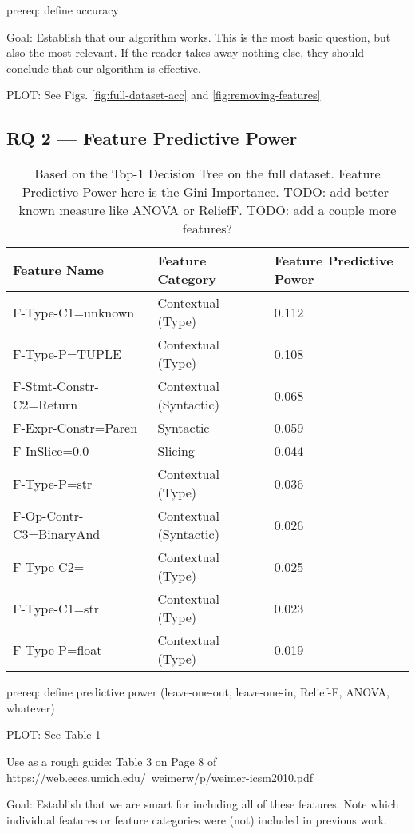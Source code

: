 \documentclass[conference]{IEEEtran}
\begin{document}
prereq: define accuracy

Goal: Establish that our algorithm works. This is the most basic question,
but also the most relevant. If the reader takes away nothing else, they
should conclude that our algorithm is effective.

PLOT: See Figs. \ref{fig:full-dataset-acc} and \ref{fig:removing-features}

\subsection{RQ 2 --- Feature Predictive Power}

\begin{table}[]
\begin{tabular}{l|l|l}
Feature Name & Feature Category & Feature Predictive Power \\ \hline
F-Type-C1=unknown & Contextual (Type) & 0.112 \\
F-Type-P=TUPLE & Contextual (Type) & 0.108 \\
F-Stmt-Constr-C2=Return & Contextual (Syntactic) & 0.068 \\
F-Expr-Constr=Paren & Syntactic & 0.059 \\
F-InSlice=0.0 & Slicing & 0.044 \\
F-Type-P=str & Contextual (Type) & 0.036 \\
F-Op-Contr-C3=BinaryAnd & Contextual (Syntactic) & 0.026 \\
F-Type-C2= & Contextual (Type) & 0.025 \\
F-Type-C1=str & Contextual (Type) & 0.023 \\
F-Type-P=float & Contextual (Type) & 0.019 \\
\end{tabular}
\caption{Based on the Top-1 Decision Tree on the full dataset. Feature Predictive Power here is the Gini Importance. TODO: add
better-known measure like ANOVA or ReliefF. TODO: add a couple more features?}
\label{tab:feature-predictive-power}
\end{table}

prereq: define predictive power (leave-one-out, leave-one-in, Relief-F,
ANOVA, whatever)

PLOT: See Table \ref{tab:feature-predictive-power}

Use as a rough guide: Table 3 on Page 8 of
https://web.eecs.umich.edu/~weimerw/p/weimer-icsm2010.pdf

Goal: Establish that we are smart for including all of these features. Note
which individual features or feature categories were (not) included in
previous work.
\end{document}
